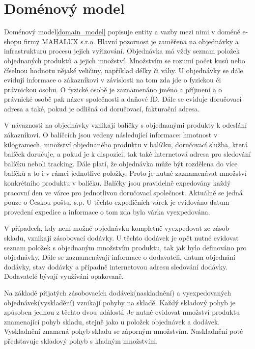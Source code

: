 \documentclass[thesis=B,czech]{FITthesis}[2012/06/26]
\begin{document}
\section{Doménový model}
	Doménový model\ref{domain_model} popisuje entity a vazby mezi nimi v doméně e-shopu firmy MAHALUX s.r.o. Hlavní pozornost je zaměřena na objednávky a infrastrukturu procesu jejich vyřizování. Objednávka má vždy seznam položek objednaných produktů a jejich množství. Množstvím se rozumí počet kusů nebo číselnou hodnotu nějaké veličiny, například délky či váhy. U objednávky se dále evidují informace o zákazníkovi v závislosti na tom zda jde o fyzickou či právnickou osobu. O fyzické osobě je zaznamenáno jméno a příjmení a o právnické osobě pak název společnosti a daňové ID. Dále se eviduje doručovací adresa a také, pokud je odlišná od doručovací, fakturační adresa.
	
	V návaznosti na objednávky vznikají balíčky s objednanými produkty k odeslání zákazníkovi. O balíčcích jsou vedeny následující informace: hmotnost v kilogramech, množství objednaného produktu v balíčku, doručovací služba, která balíček doručuje, a pokud je k dispozici, tak také internetová adresa pro sledování balíčku neboli tracking. Dále platí, že objednávka může být rozdělena do více balíčků a to i v rámci jednotlivé položky. Proto je nutné zaznamenávat množství konkrétního produktu v balíčku. Balíčky jsou pravidelně expedovány každý pracovní den ve várce pro jednotlivou doručovací společnost. Aktuálně se jedná pouze o Českou poštu, s.p. U těchto expedičních várek je evidováno datum provedení expedice a informace o tom zda byla várka vyexpedována.
	
	V případech, kdy není možné objednávku kompletně vyexpedovat ze zásob skladu, vznikají zásobovací dodávky. U těchto dodávek je opět nutné evidovat seznam položek s objednaným množstvím produktu, tak jak bylo definováno pro objednávky. Dále se zaznamenávají informace o dodavateli, datum objednání dodávky, stav dodávky a případně internetovou adresu sledování dodávky. Dodavatelé bývají využíváni opakovaně.
	
	Na základě přijatých zásobovacích dodávek(naskladnění) a vyexpedovaných objednávek(vyskladění) vznikají pohyby na skladě. Každý skladový pohyb je způsoben jednou z těchto dvou událostí. Je nutné evidovat množství produktu znamenající pohyb skladu, stejně jako u položek objednávek a dodávek. Vyskladnění znamená pohyb skladu se záporným množstvím. Naskladnění poté představuje skladový pohyb s kladným množstvím.
	
\end{document}

